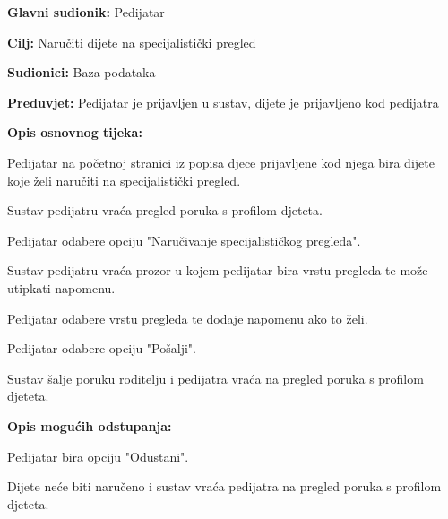 					\noindent {}
					\begin{packed_item}
						
						\item \textbf{Glavni sudionik: }Pedijatar
						\item  \textbf{Cilj:} Naručiti dijete na specijalistički pregled
						\item  \textbf{Sudionici:} Baza podataka
						\item  \textbf{Preduvjet:} Pedijatar je prijavljen u sustav, dijete je prijavljeno kod pedijatra
						\item  \textbf{Opis osnovnog tijeka:}
						
						\item[] \begin{packed_enum}
							
							\item Pedijatar na početnoj stranici iz popisa djece prijavljene kod njega bira dijete koje želi naručiti na specijalistički pregled.
							\item Sustav pedijatru vraća pregled poruka s profilom djeteta.
							\item Pedijatar odabere opciju "Naručivanje specijalističkog pregleda".
							\item Sustav pedijatru vraća prozor u kojem pedijatar bira vrstu pregleda te može utipkati napomenu.
							\item Pedijatar odabere vrstu pregleda te dodaje napomenu ako to želi.
							\item Pedijatar odabere opciju "Pošalji".
							\item Sustav šalje poruku roditelju i pedijatra vraća na pregled poruka s profilom djeteta.
						\end{packed_enum}
						
						\item  \textbf{Opis mogućih odstupanja:}
						
						\item[] \begin{packed_item}
							
							\item[6.a] Pedijatar bira opciju "Odustani".
							\item[] \begin{packed_enum}
								
								\item Dijete neće biti naručeno i sustav vraća pedijatra na pregled poruka s profilom djeteta.
							\end{packed_enum}
							
							
						\end{packed_item}
						
						
					\end{packed_item}
					
